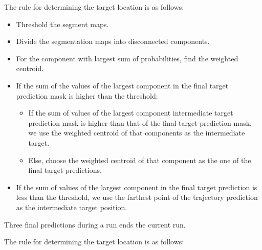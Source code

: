 \documentclass[letterpaper, 10 pt, conference]{ieeeconf}  %
\begin{document}
The rule for determining the target location is as follows:
\begin{itemize}
    \item Threshold the segment maps.
    \item Divide the segmentation maps into disconnected components.
    \item For the component with largest sum of probabilities, find the weighted centroid.
    \item If the sum of the values of the largest component in the final target prediction mask is higher than the threshold:
    \begin{itemize}
        \item If the sum of values of the largest component intermediate target prediction mask is higher than that of the final target prediction mask, we use the weighted centroid of that components as the intermediate target.
        \item Else, choose the weighted centroid of that component as the one of the final target predictions.
    \end{itemize}
    \item If the sum of values of the largest component in the final target prediction is less than the threshold, we use the farthest point of the trajectory prediction as the intermediate target position.
\end{itemize}

Three final predictions during a run ends the current run.

The rule for determining the target location is as follows:
\end{document}
